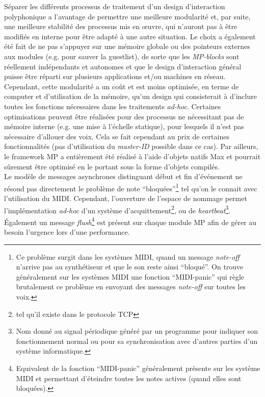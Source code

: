 \noindent Séparer les différents processus de traitement d'un design d'interaction polyphonique a l'avantage de permettre une meilleure modularité et, par suite, une meilleure stabilité des processus mis en œuvre, qui n'auront pas à être modifiés en interne pour être adapté à une autre situation. Le choix a également été fait de ne pas s'appuyer sur une mémoire globale ou des pointeurs externes aux modules (e.g. pour sauver la guestlist), de sorte que les \textit{MP-blocks} sont réellement indépendants et autonomes et que le design d'interaction général puisse être réparti sur plusieurs applications et/ou machines en réseau.\\
\indent Cependant, cette modularité a un coût et est moins optimisée, en terme de computer et d'utilisation de la mémoire, qu'un design qui consisterait à d'inclure toutes les fonctions nécessaires dans les traitements \textit{ad-hoc}. Certaines optimisations peuvent être réalisées pour des processus ne nécessitant pas de mémoire interne (e.g. une mise à l'échelle statique), pour lesquels il n'est pas nécessaire d'allouer des voix. Cela se fait cependant au prix de certaines fonctionnalités (pas d'utilisation du \textit{master-ID} possible dans ce cas). Par ailleurs, le framework MP a entièrement été réalisé à l'aide d'objets natifs Max et pourrait sûrement être optimisé en le portant sous la forme d'objets compilés.\\
\indent Le modèle de messages asynchrones distinguant début et fin d'événement ne résoud pas directement le problème de note ``bloquées''\footnote{Ce problème surgit dans les systèmes MIDI, quand un message \textit{note-off} n'arrive pas au synthétiseur et que le son reste ainsi ``bloqué''. On trouve généralement sur les systèmes MIDI une fonction ``MIDI-panic'' qui règle brutalement ce problème en envoyant des messages \textit{note-off} sur toutes les voix.} tel qu'on le connait avec l'utilisation du \gls{MIDI}. Cependant, l'ouverture de l'espace de nommage permet l'implémentation \textit{ad-hoc} d'un système d'acquittement\footnote{tel qu'il existe dans le protocole \gls{TCP}}, ou de \textit{heartbeat}\footnote{Nom donné au signal périodique généré par un programme pour indiquer son fonctionnement normal ou pour sa synchronisation avec d'autres parties d'un système informatique.}. Également un message \textit{flush}\footnote{Equivalent de la fonction ``MIDI-panic'' généralement présente sur les système MIDI et permettant d'éteindre toutes les notes actives (quand elles sont bloquées).} est présent sur chaque module MP afin de gérer au besoin l'urgence lors d'une performance.



